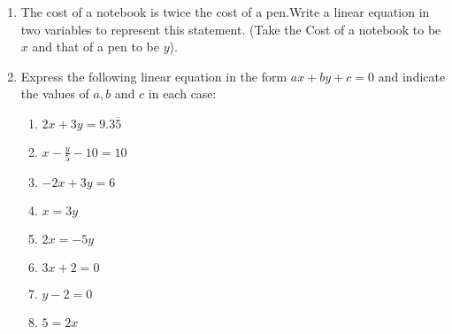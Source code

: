 \begin{enumerate}[label=\arabic*.,ref=\theenumi]
\item The cost of a notebook is twice the cost of a pen.Write a linear
equation in two variables to represent this statement.
(Take the Cost of a notebook to be $x$ and that of a pen to be
$y$).
\item Express the following linear equation in the form $ax+by+c=0$
and indicate the values of $a,b$ and $c$ in each case:
\begin{enumerate}[label=(\roman*),ref=\theenumi]
\item $2x+3y=9.3\overline{5}$
\item $x-\frac{y}{5}-10=10$
\item $-2x+3y=6$
\item $ x=3y$
\item $2x=-5y$
\item $3x+2=0$
\item $y-2=0$
\item $5=2x$
\end{enumerate}
\end{enumerate}
